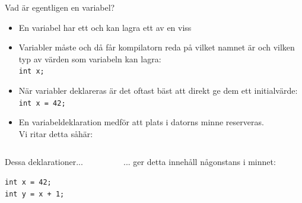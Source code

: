 \documentclass{lecturenotes}
\begin{document}
\begin{Slide}{Vad är egentligen en variabel?}\scriptsize
\begin{itemize}
\item En variabel har ett  och kan lagra ett  av en viss 
\item Variabler måste   och då får kompilatorn reda på vilket namnet är och vilken typ av värden som variabeln kan lagra: \\ \lstinline{int x; }
\item När variabler deklareras är det oftast bäst att direkt ge dem ett initialvärde:  \\ \lstinline{int x = 42; }
\item En variabeldeklaration medför att plats i datorns minne reserveras. \\Vi ritar detta såhär: \\ 
\end{itemize}

\begin{columns}
\begin{column}{0.3\textwidth}
Dessa deklarationer...
\begin{lstlisting}
int x = 42;    
int y = x + 1;   
\end{lstlisting}
\end{column}
\begin{column}{0.5\textwidth}
... ger detta innehåll någonstans i minnet:

\end{column}
\end{columns}
\end{Slide}
\end{document}
